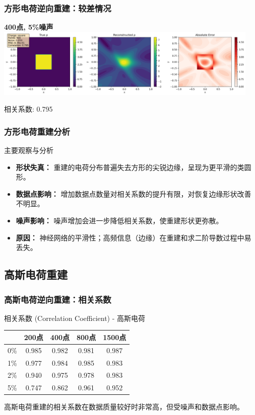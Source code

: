\documentclass[aspectratio=169]{ctexbeamer}
\begin{document}
\begin{frame}
	\frametitle{方形电荷逆向重建：较差情况}
	\begin{center}
		\textbf{400点, 5\%噪声}\\
		\includegraphics[width=0.95\textwidth]{figures/inverse_square_400pts_5noise_combined.png}

		\small 相关系数: 0.795
	\end{center}
\end{frame}

\begin{frame}
	\frametitle{方形电荷重建分析}
	\begin{alertblock}{主要观察与分析}
		\begin{itemize}
				\item \textbf{形状失真：} 重建的电荷分布普遍失去方形的尖锐边缘，呈现为更平滑的类圆形。
				\item \textbf{数据点影响：} 增加数据点数量对相关系数的提升有限，对恢复边缘形状改善不明显。
				\item \textbf{噪声影响：} 噪声增加会进一步降低相关系数，使重建形状更弥散。
				\item \textbf{原因：} 神经网络的平滑性；高频信息（边缘）在重建和求二阶导数过程中易丢失。
		\end{itemize}
	\end{alertblock}
\end{frame}

\subsection{高斯电荷重建}
\begin{frame}
  \frametitle{高斯电荷逆向重建：相关系数}
  \begin{block}{相关系数 (Correlation Coefficient) - 高斯电荷}
    \centering
    \begin{tabular}{c|cccc}
        \toprule
        & 200点 & 400点 & 800点 & 1500点 \\
        \midrule
        0\%   & 0.985 & 0.982 & 0.981 & 0.987 \\
        1\%   & 0.977 & 0.984 & 0.985 & 0.983 \\
        2\%   & 0.940 & 0.975 & 0.978 & 0.983 \\
        5\%   & 0.747 & 0.862 & 0.961 & 0.952 \\
        \bottomrule
    \end{tabular}

    \small 高斯电荷重建的相关系数在数据质量较好时非常高，但受噪声和数据点影响。
  \end{block}
\end{frame}
\end{document}
